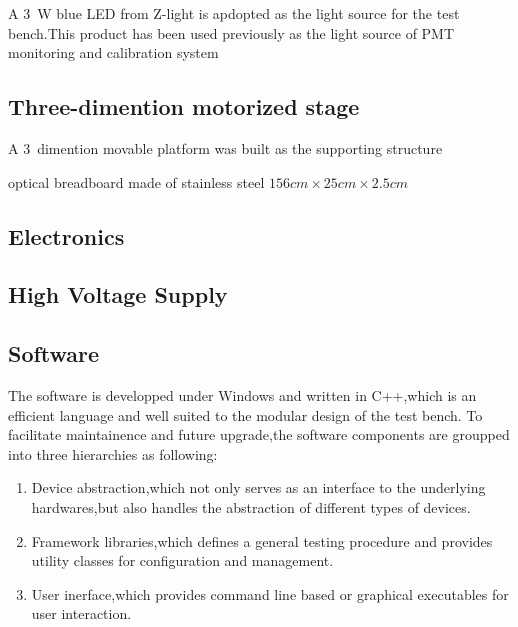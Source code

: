 \documentclass[preprint,5p,times]{elsarticle}
\begin{document}
A 3~W blue LED from Z-light\cite{zlight} is apdopted as the light source for the test bench.This product has been used previously as the light source of PMT monitoring and calibration system\cite{yuyuhong_led} 

\subsection{Three-dimention motorized stage}
\label{sec:platform}

A 3~dimention movable platform was built as the supporting structure

optical breadboard made of stainless steel $156cm\times25cm\times2.5cm$
\subsection{Electronics}
\label{sec:integrating_sphere}

\subsection{High Voltage Supply}
\label{sec:ref_pmt}

\subsection{Software}
\label{sec:software}
The software is developped under Windows and written in C++,which is an efficient language and well suited to the modular design of the test bench.
To facilitate maintainence and future upgrade,the software components are groupped into three hierarchies as following:
\begin{enumerate}
 \item Device abstraction,which not only serves as an interface to the underlying hardwares,but also handles the abstraction of different types of devices. 
 \item Framework libraries,which defines a general testing procedure and provides utility classes for configuration and management.
 \item User inerface,which provides command line based or graphical executables for user interaction. 
\end{enumerate}
\end{document}
